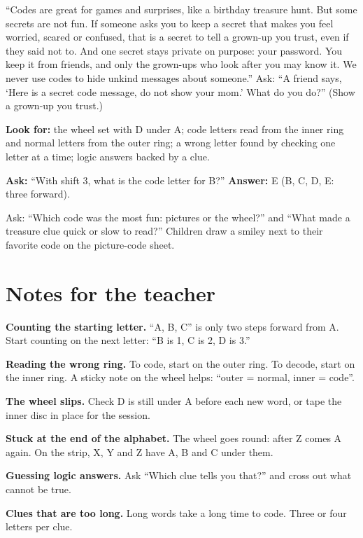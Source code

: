 \begin{safety}
\enquote{Codes are great for games and surprises, like a birthday treasure hunt. But some secrets are not fun. If someone asks you to keep a secret that makes you feel worried, scared or confused, that is a secret to tell a grown-up you trust, even if they said not to. And one secret stays private on purpose: your password. You keep it from friends, and only the grown-ups who look after you may know it. We never use codes to hide unkind messages about someone.} Ask: \enquote{A friend says, \enquote{Here is a secret code message, do not show your mom.} What do you do?} (Show a grown-up you trust.)
\end{safety}

\begin{formativecheck}
\textbf{Look for:} the wheel set with D under A; code letters read from the inner ring and normal letters from the outer ring; a wrong letter found by checking one letter at a time; logic answers backed by a clue.

\textbf{Ask:} \enquote{With shift 3, what is the code letter for B?}
\textbf{Answer:} E (B, C, D, E: three forward).
\end{formativecheck}

\begin{reflection}
Ask: \enquote{Which code was the most fun: pictures or the wheel?} and \enquote{What made a treasure clue quick or slow to read?} Children draw a smiley next to their favorite code on the picture-code sheet.
\end{reflection}

\section{Notes for the teacher}
\begin{commonmistakes}
  \item \textbf{Counting the starting letter.} \enquote{A, B, C} is only two steps forward from A. Start counting on the next letter: \enquote{B is 1, C is 2, D is 3.}
  \item \textbf{Reading the wrong ring.} To code, start on the outer ring. To decode, start on the inner ring. A sticky note on the wheel helps: \enquote{outer = normal, inner = code}.
  \item \textbf{The wheel slips.} Check D is still under A before each new word, or tape the inner disc in place for the session.
  \item \textbf{Stuck at the end of the alphabet.} The wheel goes round: after Z comes A again. On the strip, X, Y and Z have A, B and C under them.
  \item \textbf{Guessing logic answers.} Ask \enquote{Which clue tells you that?} and cross out what cannot be true.
  \item \textbf{Clues that are too long.} Long words take a long time to code. Three or four letters per clue.
\end{commonmistakes}

